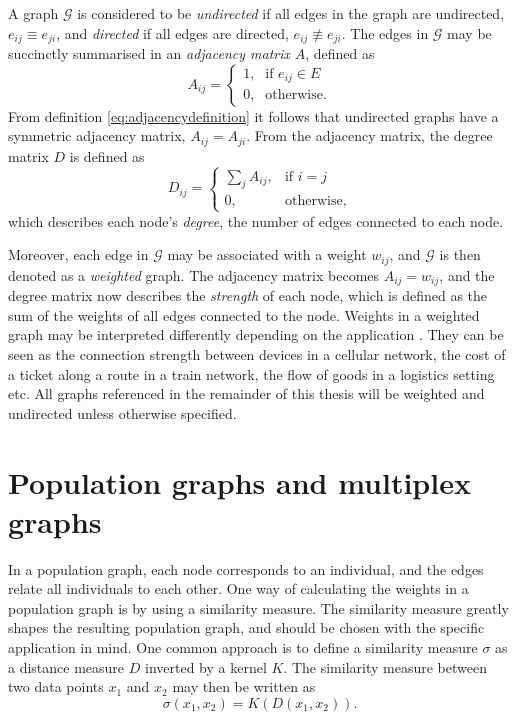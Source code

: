 A graph $\mathcal{G}$ is considered to be \textit{undirected} if all edges in the graph are undirected, $e_{ij} \equiv e_{ji}$, and \textit{directed} if all edges are directed, $e_{ij} \not\equiv e_{ji}$. The edges in $\mathcal{G}$ may be succinctly summarised in an \textit{adjacency matrix} $A$, defined as
\begin{equation}
    A_{ij} = \begin{cases} \mbox{1,} & \mbox{if } e_{ij} \in E \\ \mbox{0,} & \mbox{otherwise.} \end{cases}
    \label{eq:adjacencydefinition}
\end{equation}
From definition \eqref{eq:adjacencydefinition} it follows that undirected graphs have a symmetric adjacency matrix, $A_{ij} = A_{ji}$. From the adjacency matrix, the degree matrix $D$ is defined as
\begin{equation}
    D_{ij} = \begin{cases} \sum_j A_{ij}, & \mbox{if } i = j \\ \mbox{0,} & \mbox{otherwise,} \end{cases}
    \label{eq:degreematrixdefinition}
\end{equation}
which describes each node's \textit{degree}, the number of edges connected to each node.

Moreover, each edge in $\mathcal{G}$ may be associated with a weight $w_{ij}$, and $\mathcal{G}$ is then denoted as a \textit{weighted} graph. The adjacency matrix becomes $A_{ij} = w_{ij}$, and the degree matrix now describes the \textit{strength} of each node, which is defined as the sum of the weights of all edges connected to the node. Weights in a weighted graph may be interpreted differently depending on the application \cite{adventures_in_graph_theory_chap1}. They can be seen as the connection strength between devices in a cellular network, the cost of a ticket along a route in a train network, the flow of goods in a logistics setting etc. All graphs referenced in the remainder of this thesis will be weighted and undirected unless otherwise specified.

\section{Population graphs and multiplex graphs}
\label{sec:similarity_measure}

In a population graph, each node corresponds to an individual, and the edges relate all individuals to each other. One way of calculating the weights in a population graph is by using a similarity measure. The similarity measure greatly shapes the resulting population graph, and should be chosen with the specific application in mind. One common approach is to define a similarity measure $\sigma$ as a distance measure $D$ inverted by a kernel $K$. The similarity measure between two data points $x_1$ and $x_2$ may then be written as
\begin{equation}
    \sigma(x_1,x_2) = K \left(D\left(x_1, x_2\right) \right).
    \label{eq:similarity_measure}
\end{equation}

